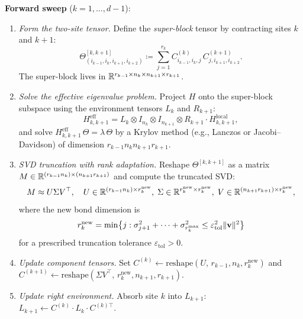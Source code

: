 \noindent\textbf{Forward sweep} ($k = 1, \ldots, d-1$):
\begin{enumerate}
\item \emph{Form the two-site tensor.} Define the \emph{super-block}
    tensor by contracting sites $k$ and $k+1$:
    \begin{equation}
    \label{eq:app:superblock}
        \Theta^{[k,k+1]}_{(i_{k-1}, i_k, i_{k+1}, i_{k+2})}
        \coloneqq \sum_{j=1}^{r_k}
        C^{(k)}_{i_{k-1}, i_k, j}\, C^{(k+1)}_{j, i_{k+1}, i_{k+2}}.
    \end{equation}
    The super-block lives in $\mathbb{R}^{r_{k-1} \times n_k \times n_{k+1}
    \times r_{k+1}}$.

\item \emph{Solve the effective eigenvalue problem.} Project $H$ onto
    the super-block subspace using the environment tensors $L_k$ and
    $R_{k+1}$:
    \begin{equation}
    \label{eq:app:effective_H}
        H^{\mathrm{eff}}_{k,k+1}
        = L_k \otimes I_{n_k} \otimes I_{n_{k+1}} \otimes R_{k+1}
        \cdot H_{k,k+1}^{\mathrm{local}},
    \end{equation}
    and solve $H^{\mathrm{eff}}_{k,k+1}\, \Theta = \lambda\, \Theta$
    by a Krylov method (e.g., Lanczos or Jacobi--Davidson) of
    dimension $r_{k-1} n_k n_{k+1} r_{k+1}$.

\item \emph{SVD truncation with rank adaptation.}
    Reshape $\Theta^{[k,k+1]}$ as a matrix
    $M \in \mathbb{R}^{(r_{k-1} n_k) \times (n_{k+1} r_{k+1})}$ and compute
    the truncated SVD:
    \begin{equation}
    \label{eq:app:svd_truncation}
        M \approx U \Sigma V^\top,
        \quad U \in \mathbb{R}^{(r_{k-1} n_k) \times r_k^{\mathrm{new}}},\;
        \Sigma \in \mathbb{R}^{r_k^{\mathrm{new}} \times r_k^{\mathrm{new}}},\;
        V \in \mathbb{R}^{(n_{k+1} r_{k+1}) \times r_k^{\mathrm{new}}},
    \end{equation}
    where the new bond dimension is
    \begin{equation}
    \label{eq:app:rank_criterion}
        r_k^{\mathrm{new}}
        = \min\bigl\{j : \sigma_{j+1}^2 + \cdots + \sigma_{r_k^{\max}}^2
        \leq \varepsilon^2_{\mathrm{tol}} \|\mathbf{v}\|^2\bigr\}
    \end{equation}
    for a prescribed truncation tolerance $\varepsilon_{\mathrm{tol}} > 0$.

\item \emph{Update component tensors.}
    Set $C^{(k)} \leftarrow \mathrm{reshape}(U,\, r_{k-1},n_k,r_k^{\mathrm{new}})$
    and $C^{(k+1)} \leftarrow \mathrm{reshape}(\Sigma V^\top,\, r_k^{\mathrm{new}},n_{k+1},r_{k+1})$.

\item \emph{Update right environment.} Absorb site $k$ into $L_{k+1}$:
    $L_{k+1} \leftarrow C^{(k)} \cdot L_k \cdot C^{(k)\top}$.
\end{enumerate}

